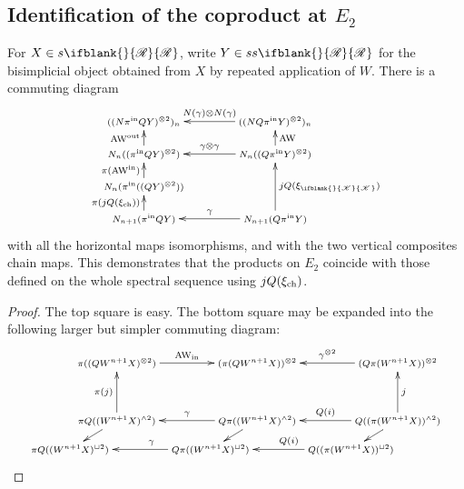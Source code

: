 \documentclass[10pt]{article}
\newcommand{\PRLie}[1]%
{\ifblank{#1}{\scrR}{\scrR^{#1}}}
\newcommand{\LL}[1]{\ifblank{#1}{\scrK}{\scrK^{#1}}}
\begin{document}
\begin{Grothendieck Multiplicativity}
\subsection{Identification of the coproduct at $E_2$}
\begin{thm}
For $X\in s\PRLie{}$, write $Y\in ss\PRLie{}$ for the bisimplicial object obtained from $X$ by repeated application of $W$. There is a commuting diagram
\[\xymatrix@C=13mm@R=4mm{
((N\pi^{\textup{in}}QY)^{\otimes2})_n&%
((NQ\pi^{\textup{in}}Y)^{\otimes2})_{n}
\ar[l]_-{N(\gamma)\otimes N(\gamma)}
\\%
N_n((\pi^{\textup{in}}QY)^{\otimes2})
\ar[u]^-{\textup{AW}^\textup{out}}
&%
N_n((Q\pi^{\textup{in}}Y)^{\otimes2})
\ar[u]_-{\textup{AW}}
\ar[l]_-{\gamma\otimes\gamma}
\\%
N_n(\pi^\textup{in}((QY)^{\otimes2}))
\ar[u]^-{\pi(\textup{AW}^\textup{in})}
&%
\\%
N_{n+1}(\pi^\textup{in} QY)
\ar[u]^-{\pi(j\circ Q(\xi_\textup{ch}))}
&%
N_{n+1}(Q\pi^\textup{in} Y)
\ar[uu]_-{j\circ Q(\xi_{\LL{}})}
\ar[l]_-{\gamma}
}\]
with all the horizontal maps isomorphisms, and with the two vertical composites chain maps. This demonstrates that the products on $E_2$ coincide with those defined on the whole spectral sequence using $j\circ Q(\xi_\textup{ch})$.
\end{thm}
\begin{proof}
The top square is easy. The bottom square may be expanded into the following larger but simpler commuting diagram:
\[
\def\objectstyle{\scriptstyle}
\xymatrix@R=8mm@C=13mm@!0{
&%
\pi((QW^{n+1}X)^{\otimes2}) \ar[rrr]^-{\textup{AW}_{\textup{in}}}
&%
&%
&%
(\pi (QW^{n+1}X))^{\otimes2}&%
&%
&%
(Q\pi(W^{n+1}X))^{\otimes2} \ar[lll]_-{\gamma^{\otimes2}}\\\\%
&%
\pi Q((W^{n+1}X)^{\wedge 2})\ar[uu]^-{\pi(j)}
\ar[dl]
&%
&%
&%
Q\pi((W^{n+1}X)^{\wedge 2})\ar[lll]_-{\gamma}\ar[dl]
&%
&%
&%
Q((\pi( W^{n+1}X))^{\wedge 2})\ar[dl]
\ar[uu]_-{j}
\ar[lll]_-{Q(i)}
\\
\pi Q((W^{n+1}X)^{\sqcup 2})
&%
&%
&%
Q\pi((W^{n+1}X)^{\sqcup 2})\ar[lll]_-(.3){\gamma}
&%
&%
&%
Q((\pi( W^{n+1}X))^{\sqcup 2})
\ar[lll]_-(.3){Q(i)}
}\]
\end{proof}
\end{Grothendieck Multiplicativity}
\end{document}
